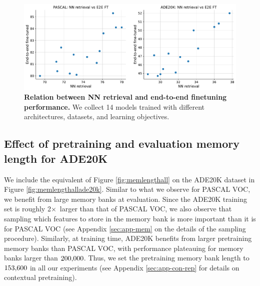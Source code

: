 \documentclass{article}
\newcommand{\x}{$\times$}
\begin{document}
\begin{figure}[ht]
  \begin{center}
    \includegraphics[width=\textwidth]{figures/figure_correlation.pdf}
  \end{center}
\vspace{-1em}
\caption{\textbf{Relation between NN retrieval and end-to-end finetuning performance.} We collect 14 models trained with different architectures, datasets, and learning objectives.}
\label{fig:correlation}
\end{figure}

\subsection{Effect of pretraining and evaluation memory length for ADE20K} \label{sec:app-memorylength}

We include the equivalent of Figure \ref{fig:memlengthall} on the ADE20K dataset in Figure \ref{fig:memlengthallade20k}. Similar to what we observe for PASCAL VOC, we benefit from large memory banks at evaluation. Since the ADE20K training set is roughly 2\x \ larger than that of PASCAL VOC, we also observe that sampling which features to store in the memory bank is more important than it is for PASCAL VOC (see Appendix \ref{sec:app-mem} on the details of the sampling procedure). Similarly, at training time, ADE20K benefits from larger pretraining memory banks than PASCAL VOC, with performance plateauing for memory banks larger than $200{\small,}000$. Thus, we set the pretraining memory bank length to $153{\small,}600$ in all our experiments (see Appendix \ref{sec:app-con-rep} for details on contextual pretraining).
\end{document}
